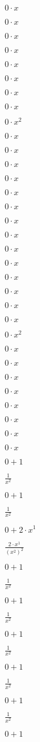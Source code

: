 $0 \cdot x$

$0 \cdot x$

$0 \cdot x$

$0 \cdot x$

$0 \cdot x$

$0 \cdot x$

$0 \cdot x$

$0 \cdot x$

$0 \cdot x^{2}$

$0 \cdot x$

$0 \cdot x$

$0 \cdot x$

$0 \cdot x$

$0 \cdot x$

$0 \cdot x$

$0 \cdot x$

$0 \cdot x$

$0 \cdot x$

$0 \cdot x$

$0 \cdot x$

$0 \cdot x$

$0 \cdot x$

$0 \cdot x$

$0 \cdot x^{2}$

$0 \cdot x$

$0 \cdot x$

$0 \cdot x$

$0 \cdot x$

$0 \cdot x$

$0 \cdot x$

$0 \cdot x$

$0 \cdot x$

$0+1$

$ \frac{1}{x^{2}} $

$0+1$

$ \frac{1}{x^{2}} $

$0+2 \cdot x^{1}$

$ \frac{2 \cdot x^{1}}{(x^{2})^{2}} $

$0+1$

$ \frac{1}{x^{2}} $

$0+1$

$ \frac{1}{x^{2}} $

$0+1$

$ \frac{1}{x^{2}} $

$0+1$

$ \frac{1}{x^{2}} $

$0+1$

$ \frac{1}{x^{2}} $

$0+1$

